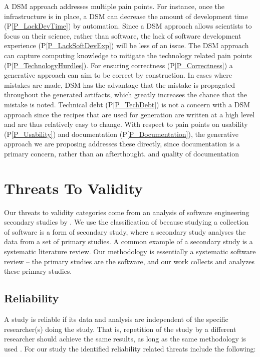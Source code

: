 \documentclass[final, 3p, times, authoryear]{elsarticle}
\newcommand{\ppref}[1]{P\ref{#1}}
\begin{document}
A DSM approach addresses multiple pain points.  For instance, once the
infrastructure is in place, a DSM can decrease the amount of development time
(\ppref{P_LackDevTime}) by automation.  Since a DSM approach allows scientists
to focus on their science, rather than software, the lack of software
development experience (\ppref{P_LackSoftDevExp}) will be less of an issue. The
DSM approach can capture computing knowledge to mitigate the technology related
pain points (\ppref{P_TechnologyHurdles}).  For ensuring correctness
(\ppref{P_Correctness}) a generative approach can aim to be correct by
construction.  In cases where mistakes are made, DSM has the advantage that the
mistake is propagated throughout the generated artifacts, which greatly
increases the chance that the mistake is noted.  Technical debt
(\ppref{P_TechDebt}) is not a concern with a DSM approach since the recipes that
are used for generation are written at a high level and are thus relatively easy
to change.  With respect to pain points on usability (\ppref{P_Usability}) and
documentation (\ppref{P_Documentation}), the generative approach we are
proposing addresses these directly, since documentation is a primary concern,
rather than an afterthought. and quality of documentation 

\section{Threats To Validity} \label{threats}

Our threats to validity categories come from an analysis of software engineering
secondary studies by \citet{AmpatzoglouEtAl2019}.  We use the classification of
\citep{AmpatzoglouEtAl2019} because studying a collection of software is a form
of secondary study, where a secondary study analyses the data from a set of
primary studies.  A common example of a secondary study is a systematic
literature review.  Our methodology is essentially a systematic software review
-- the primary studies are the software, and our work collects and analyzes
these primary studies.

\subsection{Reliability}

A study is reliable if its data and analysis are independent of the specific
researcher(s) doing the study.  That is, repetition of the study by a different
researcher should achieve the same results, as long as the same methodology is
used \citep{AmpatzoglouEtAl2019}.  For our study the identified reliability
related threats include the following:
\end{document}
